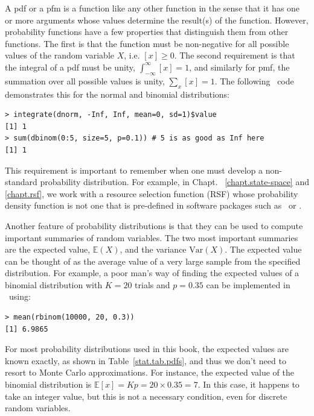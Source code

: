 A pdf or a pfm is a function like any other function
in the sense that it has one or more arguments whose values determine
the result(s) of the function. However, probability functions have a few
properties that distinguish them from other functions.
The first is that the function
must be non-negative for all possible values of the random variable
$X$, i.e. $[x] \geq 0$. The second requirement is that the integral of
a pdf must be unity, $\int_{-\infty}^{\infty} [x] = 1$, and similarly
for pmf, the summation over all possible values is unity, $\sum_x [x]
= 1$. The following \R~code demonstrates
this for the normal and binomial distributions:
\begin{verbatim}
> integrate(dnorm, -Inf, Inf, mean=0, sd=1)$value
[1] 1
> sum(dbinom(0:5, size=5, p=0.1)) # 5 is as good as Inf here
[1] 1
\end{verbatim}
This requirement is important to remember when one must develop a
non-standard probability distribution. For example, in Chapt.
~\ref{chapt.state-space} and \ref{chapt.rsf},
we work with a resource selection function (RSF) whose probability
density function is not one that is pre-defined in software packages
such as \R~or \bugs.

Another feature of probability distributions is that they can be used
to compute important summaries of random variables. The two most
important summaries are the expected value, $\mathbb{E}(X)$,
and the variance $\text{Var}(X)$. The expected value
can be thought of as the average
value of a very large sample from the specified distribution. For
example, a poor man's way of finding the expected values of a binomial
distribution with $K=20$ trials and $p=0.35$ can be implemented in \R~using:
\begin{verbatim}
> mean(rbinom(10000, 20, 0.3))
[1] 6.9865
\end{verbatim}
For most probability distributions used in this book, the expected
values are known exactly, as shown in Table~\ref{stat.tab.pdfs}, and
thus we don't need to resort to Monte Carlo approximations. For instance, the
expected value of the binomial distribution is $\mathbb{E}[x] = Kp =
20 \times 0.35 = 7$. In this case, it happens to take an integer
value, but this is not a necessary condition, even for discrete random
variables.

